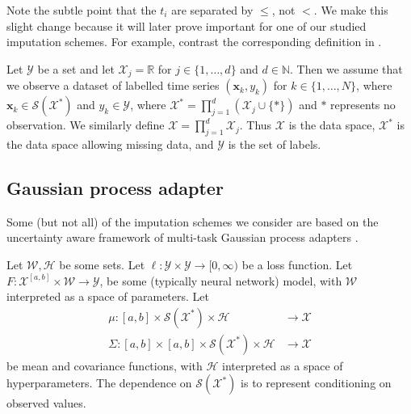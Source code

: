 \documentclass{article}
\renewcommand{\subsubsection}[1]{\textbf{#1}

} %
\newcommand{\reals}{\mathbb{R}}
\newcommand{\naturals}{\mathbb{N}}
\newcommand{\dataspace}{\mathcal{X}}
\newcommand{\lspace}{\mathcal{Y}}
\newcommand{\seriesspace}{\mathcal{S}}
\begin{document}
Note the subtle point that the $t_i$ are separated by $\leq$, not $<$. We make this slight change because it will later prove important for one of our studied imputation schemes. For example, contrast the corresponding definition in \cite[Section 1]{toth2019gp}.

Let $\lspace$ be a set and let $\dataspace_j = \reals$ for $j \in \{1, \ldots, d\}$ and $d \in \naturals$. Then we assume that we observe a dataset of labelled time series $(\mathbf{x}_k, y_k)$ for $k \in \{1, \ldots, N\}$, where $\mathbf{x}_k \in \seriesspace(\dataspace^*)$ and $y_k \in \lspace$, where $\dataspace^* = \prod_{j = 1}^d(\dataspace_j \cup \{*\})$ and $*$ represents no observation. We similarly define
$\dataspace = \prod_{j = 1}^d\dataspace_j.$ Thus $\dataspace$ is the data space, $\dataspace^*$ is the data space allowing missing data, and $\lspace$ is the set of labels.


\subsection{Gaussian process adapter}\label{section:gpadapter}
Some (but not all) of the imputation schemes we consider are based on the uncertainty aware framework of multi-task Gaussian process adapters \cite{li2016scalable, futoma2017mgp}.

Let $\mathcal{W}, \mathcal{H}$ be some sets. Let $\ell \colon \lspace \times \lspace \to [0, \infty)$ be a loss function. Let $F \colon \dataspace^{[a, b]} \times \mathcal{W} \to \lspace$, be some (typically neural network) model, with $\mathcal{W}$ interpreted as a space of parameters. Let
\begin{align*}
\mu \colon [a, b] \times \seriesspace(\dataspace^*) \times \mathcal{H} &\to \dataspace\\
\Sigma \colon [a, b] \times [a, b] \times \seriesspace(\dataspace^*) \times \mathcal{H} &\to \dataspace    
\end{align*}
be mean and covariance functions, with $\mathcal{H}$ interpreted as a space of hyperparameters. The dependence on $\seriesspace(\dataspace^*)$ is to represent conditioning on observed values.
\end{document}
